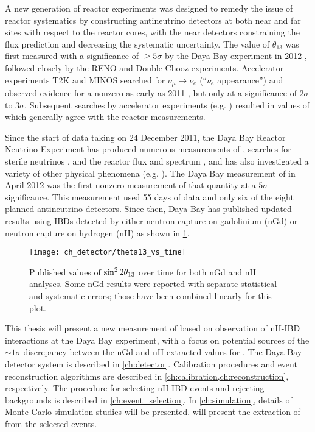 A new generation of reactor experiments
was designed to remedy the issue of reactor systematics
by constructing antineutrino detectors at both near and far sites
with respect to the reactor cores,
with the near detectors constraining the \nuebar{} flux prediction
and decreasing the systematic uncertainty.
The value of $\theta_{13}$ was first measured
with a significance of $\geq 5\sigma$
by the Daya Bay experiment in 2012 \cite{ngd2012},
followed closely by the RENO \cite{reno2012}
and Double Chooz \cite{doublechooz2012} experiments.
Accelerator experiments T2K and MINOS
searched for $\nu_\mu\to\nu_e$ (``$\nu_e$ appearance'')
and observed evidence for a nonzero \thetaot{}
as early as 2011 \cite{t2k2011,minos2011},
but only at a significance of $2\sigma$ to $3\sigma$.
Subsequent searches by accelerator experiments (e.g. \cite{t2k2018})
resulted in values of \thetaot{} which generally agree
with the reactor measurements.

Since the start of data taking on 24 December 2011,
the Daya Bay Reactor Neutrino Experiment has produced numerous measurements of
\thetaot{}, searches for sterile neutrinos \cite{dyb_sterile2020},
and the reactor \nuebar{} flux and spectrum \cite{dyb_spec_decomp2019},
and has also investigated
a variety of other physical phenomena (e.g. \cite{dyb_cpt2018}).
The Daya Bay measurement of \thetaot{} in April 2012
was the first nonzero measurement of that quantity
at a $5\sigma$ significance.
This measurement used 55 days of \nuebar{} data
and only six of the eight planned antineutrino detectors.
Since then, Daya Bay has published updated results using IBDs detected by
either neutron capture on gadolinium (nGd)
\cite{ngd2012,ngd2013,ngd2014,ngd2015,ngd2016,ngd2018}
or neutron capture on hydrogen (nH)
\cite{nh2014,nh2016}
as shown in \cref{fig:theta13_vs_t}.

\begin{figure}
    \centering
    \texttt{[image: ch\_detector/theta13\_vs\_time]}
    \caption[Daya Bay \thetaot{} results over time]{
        Published values of $\sin^{2}2\theta_{13}$ over time
        for both nGd and nH analyses.
        Some nGd results were reported with separate statistical
        and systematic errors;
        those have been combined linearly for this plot.
    }
    \label{fig:theta13_vs_t}
\end{figure}

This thesis will present a new measurement of \thetaot{}
based on observation of nH-IBD interactions
at the Daya Bay experiment,
with a focus on potential sources of the $\sim1\sigma$ discrepancy
between the nGd and nH extracted values for \thetaot{}.
The Daya Bay detector system is described in \cref{ch:detector}.
Calibration procedures and event reconstruction algorithms
are described in \cref{ch:calibration,ch:reconstruction}, respectively.
The procedure for selecting nH-IBD events and rejecting backgrounds
is described in \cref{ch:event_selection}.
In \cref{ch:simulation}, details of Monte Carlo simulation studies
will be presented.
 will present the extraction of \thetaot{}
from the selected events.

